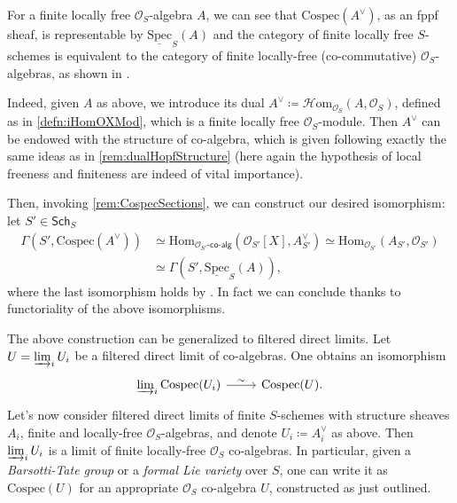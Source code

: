 \begin{rem}[]
	For a finite locally free $\mathcal{O}_{ S }$-algebra $A$,
	we can see that $\mathrm{Cospec}(A^{\vee})$, as an fppf sheaf, is representable 
	by $\underline{\mathrm{Spec}}_S(A)$ and
	the category of finite locally free $S$-schemes
	is equivalent to the category of finite locally-free (co-commutative)
	$\mathcal{O}_{ S }$-algebras, as shown in 
	\cite[Chapter III, remark 2.1.2]{Messing}.

	Indeed, given $A$ as above, we introduce its dual
	$A^{\vee} \coloneqq \mathcal{H}\mathrm{om}_{\mathcal{O}_{ S }} \left( A, \mathcal{O}_{ S } \right)$,
	defined as in \cref{defn:iHomOXMod}, which is a
	finite locally free $\mathcal{O}_{ S }$-module.
	Then $A^{\vee}$ can be endowed with the structure of co-algebra, which is
	given following exactly the same ideas as in \cref{rem:dualHopfStructure}
	(here again the hypothesis of local freeness and finiteness are indeed
	of vital importance).

	Then, invoking \cref{rem:CospecSections}, we can construct 
	our desired isomorphism: let $S' \in \mathsf{Sch}_{ S }$
	\begin{align*}
		\Gamma(S', \mathrm{Cospec}(A^{\vee})) &\simeq
		\mathrm{Hom}_{ \mathcal{O}_{ S' }\text{-}\mathsf{co}\text{-}\mathsf{alg}} 
		\left( \mathcal{O}_{ S' }[X], A^\vee_{S'} \right) \simeq
		\mathrm{Hom}_{ \mathcal{O}_{ S' }}
		\left( A_{S'}, \mathcal{O}_{ S' } \right) \\
		&\simeq
		\Gamma(S', \underline{\mathrm{Spec}}_S(A))
	,\end{align*}
	where the last isomorphism holds by 
	\cite[\href{https://stacks.math.columbia.edu/tag/01LV}{Lemma 01LV}]{SP}.
	In fact we can conclude thanks to functoriality of the above isomorphisms.
\end{rem}


\begin{rem}
	The above construction can be generalized to
	filtered direct limits.
	Let $U = \varinjlim_i U_i$ be a filtered direct limit
	of co-algebras. One obtains an isomorphism
	\begin{equation*}
	\begin{tikzcd}[row sep = 0ex
		,/tikz/column 1/.append style={anchor=base east}
		,/tikz/column 2/.append style={anchor=base west}]
		\varinjlim_i \mathrm{Cospec}(U_i) \arrow[r, "\sim", rightarrow] &
		\mathrm{Cospec}(U)
	.\end{tikzcd}
	\end{equation*} 
	Let's now consider filtered direct limits of 
	finite $S$-schemes with structure sheaves $A_i$,
	finite and locally-free $\mathcal{O}_{ S }$-algebras, 
	and denote $U_i \coloneqq A_i^\vee$ as above.
	Then $\varinjlim_i U_i$ is a limit 
	of finite locally-free $\mathcal{O}_{ S }$ co-algebras.
	In particular, given a {\em Barsotti-Tate group} or a {\em formal Lie variety}
	over $S$, one can write it as $\mathrm{Cospec}(U)$ for an appropriate 
	$\mathcal{O}_{ S }$ co-algebra $U$, constructed as just outlined.
\end{rem}


